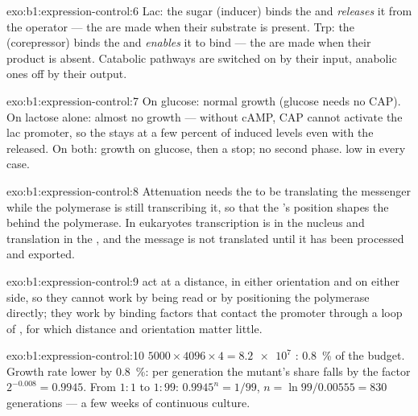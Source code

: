\begin{solution}{exo:b1:expression-control:6}
Lac: the sugar (inducer) binds the  and \emph{releases} it
from the operator --- the  are made when their substrate is
present. Trp: the  (corepressor) binds the  and
\emph{enables} it to bind --- the  are made when their product
is absent. Catabolic pathways are switched on by their input,
anabolic ones off by their output.
\end{solution}

\begin{solution}{exo:b1:expression-control:7}
On glucose: normal growth (glucose needs no CAP). On lactose alone:
almost no growth --- without cAMP, CAP cannot activate the lac
promoter, so the  stays at a few percent of induced levels even
with the  released. On both: growth on glucose, then a stop;
no second phase.  low in every case.
\end{solution}

\begin{solution}{exo:b1:expression-control:8}
Attenuation needs the  to be translating the messenger while
the polymerase is still transcribing it, so that the 's
position shapes the  behind the polymerase. In eukaryotes
transcription is in the nucleus and translation in the , and
the message is not translated until it has been processed and
exported.
\end{solution}

\begin{solution}{exo:b1:expression-control:9}
 act at a distance, in either orientation and on either
side, so they cannot work by being read or by positioning the
polymerase directly; they work by binding factors that contact the
promoter through a loop of , for which distance and orientation
matter little.
\end{solution}

\begin{solution}{exo:b1:expression-control:10}
$5000\times 4096\times 4 = \num{8.2e7}$ : \qty{0.8}{\%} of the
budget. Growth rate lower by \qty{0.8}{\%}: per generation the mutant's
share falls by the factor $2^{-0.008} = 0.9945$. From $1:1$ to
$1:99$: $0.9945^n = 1/99$, $n = \ln 99/0.00555 = 830$ generations ---
a few weeks of continuous culture.
\end{solution}

